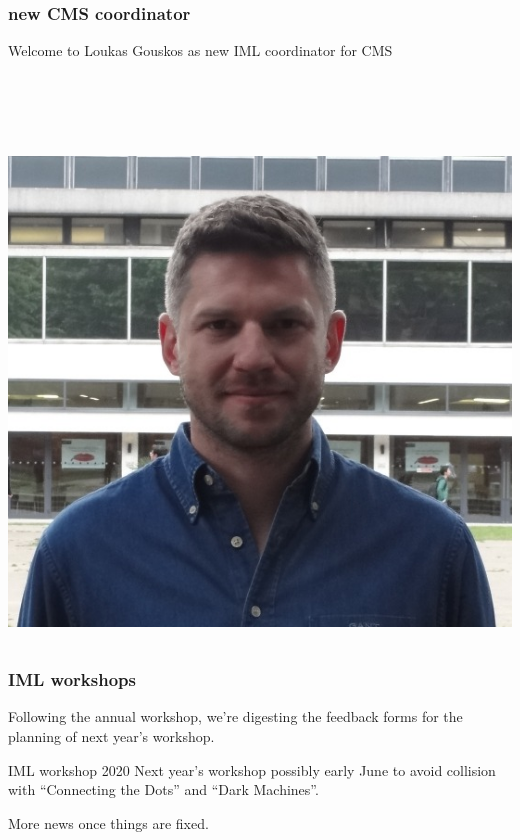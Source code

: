 \maketitle

\begin{frame}
  \frametitle{new CMS coordinator}
  Welcome to Loukas Gouskos as new IML coordinator for CMS

  {~}

  {~}

  \begin{columns}
    \begin{column}{.4\textwidth}
      \includegraphics[width=\textwidth]{./loukas.png}
    \end{column}
  \end{columns}
\end{frame}

\begin{frame}
  \frametitle{IML workshops}
  Following the annual workshop, we're digesting the feedback forms for the planning of next year's workshop.

  \begin{block}{IML workshop 2020}
    Next year's workshop possibly early June to avoid collision with ``Connecting the Dots'' and ``Dark Machines''.

    More news once things are fixed.
  \end{block}
\end{frame}

